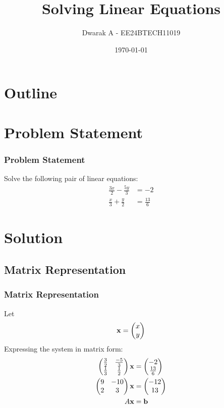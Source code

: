 \documentclass{beamer}
\title{Solving Linear Equations}
\author{Dwarak A - EE24BTECH11019}
\date{\today}
\begin{document}
\begin{frame}
\titlepage
\end{frame}

\section*{Outline}
\begin{frame}
\tableofcontents
\end{frame}

\section{Problem Statement}
\begin{frame}
\frametitle{Problem Statement}
Solve the following pair of linear equations:
\begin{align}
    \frac{3x}{2} - \frac{5y}{3} &= -2 \\
    \frac{x}{3} + \frac{y}{2} &= \frac{13}{6}
\end{align}
\end{frame}

\section{Solution}
\subsection{Matrix Representation}
\begin{frame}
\frametitle{Matrix Representation}
Let
\begin{align}
    \mathbf{x} = \begin{pmatrix}x \\ y\end{pmatrix}
\end{align}
Expressing the system in matrix form:
\begin{align}
    \begin{pmatrix}\frac{3}{2} & \frac{-5}{3}\\ \frac{1}{3} & \frac{1}{2}\end{pmatrix}\mathbf{x} &= \begin{pmatrix}-2\\\frac{13}{6}\end{pmatrix} \\
    \begin{pmatrix}9 & -10 \\ 2 & 3\end{pmatrix}\mathbf{x} &= \begin{pmatrix}-12 \\ 13\end{pmatrix} \\
    A\mathbf{x} &= \mathbf{b}
\end{align}
\end{frame}
\end{document}
